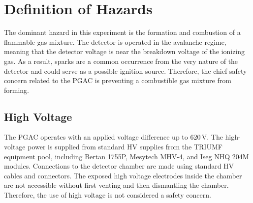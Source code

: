 \section{Definition of Hazards}
The dominant hazard in this experiment is the formation and combustion of a flammable gas
mixture.  The detector is operated in the avalanche regime, meaning that the detector voltage is near the breakdown voltage of the ionizing gas.  As a result, sparks are a common occurrence from the very nature of the detector and could serve as a possible ignition source.  Therefore, the chief safety concern related to the PGAC is preventing a combustible gas 
mixture from  forming.


\subsection{High Voltage}
The PGAC operates with an applied voltage difference up to 620\,V. The high-voltage power is supplied from standard HV supplies from the TRIUMF equipment pool, including Bertan 1755P, Mesytech MHV-4, and Iseg NHQ 204M modules.  Connections to the detector chamber are made using standard HV cables and connectors. The exposed high voltage electrodes inside the chamber are not accessible without first venting and then dismantling the chamber.  Therefore, the use of high voltage is not considered a safety concern.
